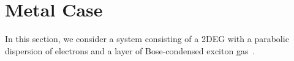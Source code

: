 %
%

%
\section{Metal Case}
In this section, we consider a system consisting of a 2DEG with a parabolic dispersion of electrons and a layer of Bose-condensed exciton gas~\cite{Butov:2003aa,Fogler:2014aa,Butov:2017aa}.
